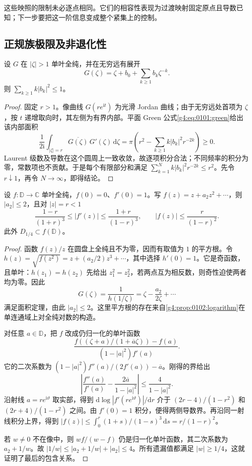 这些映照的限制未必逐点相同。它们的相容性表现为过渡映射固定原点且导数已知；下一步要把这一阶信息变成整个紧集上的控制。

\subsection{正规族极限及非退化性}
\label{g4:subsec:0503:03}

\begin{lemma}[面积定理]
	\label{g4:lem:0503:area}
	设 \(G\) 在 \(|\zeta|>1\) 单叶全纯，并在无穷远有展开
	\[
		G(\zeta)=\zeta+b_0+\sum_{k\ge1}b_k\zeta^{-k}.
	\]
	则 \(\sum_{k\ge1}k|b_k|^2\le1\)。
\end{lemma}
\begin{proof}
	固定 \(r>1\)。像曲线 \(G(re^{\mathrm{i}t})\) 为光滑 Jordan 曲线；由于无穷远处首项为 \(\zeta\)，按 \(t\) 递增取向时，其左侧为有界内部。平面 Green 公式\eqref{g4:eq:0101:green}给出该内部面积
	\[
		\frac1{2\mathrm{i}}\int_{|\zeta|=r}\overline{G(\zeta)}\,G'(\zeta)\,\mathrm{d}\zeta
		=\pi\left(r^2-\sum_{k\ge1}k|b_k|^2r^{-2k}\right)\ge0.
	\]
	Laurent 级数及导数在这个圆周上一致收敛，故逐项积分合法；不同频率的积分为零，常数项也不贡献。于是每个有限部分和满足 \(\sum_{k=1}^Nk|b_k|^2r^{-2k}\le r^2\)。先令 \(r\downarrow1\)，再令 \(N\to\infty\)，即得结论。
\end{proof}

\begin{lemma}
	\label{g4:lem:0503:distortion}
	设 \(f:\mathbb D\to\mathbb C\) 单叶全纯，\(f(0)=0\)、\(f'(0)=1\)。写 \(f(z)=z+a_2z^2+\cdots\)，则 \(|a_2|\le2\)，且对 \(|z|=r<1\)
	\[
		\frac{1-r}{(1+r)^3}\le |f'(z)|\le\frac{1+r}{(1-r)^3},
		\qquad |f(z)|\le\frac r{(1-r)^2}.
	\]
	此外 \(D_{1/4}\subset f(\mathbb D)\)。
\end{lemma}
\begin{proof}
	函数 \(f(z)/z\) 在圆盘上全纯且不为零，因而有取值为 \(1\) 的平方根。令 \(h(z)=\sqrt{f(z^2)}=z+(a_2/2)z^3+\cdots\)，其中选择 \(h'(0)=1\)。它是奇函数，且单叶：\(h(z_1)=h(z_2)\) 先给出 \(z_1^2=z_2^2\)，若两点互为相反数，则奇性迫使两者均为零。因此
	\[
		G(\zeta)=\frac1{h(1/\zeta)}=\zeta-\frac{a_2}{2\zeta}+\cdots
	\]
	满足面积定理，由此 \(|a_2|\le2\)。这里平方根的存在来自\cref{g4:prop:0102:logarithm}在单连通域上对全纯对数的构造。

	对任意 \(a\in\mathbb D\)，把 \(f\) 改成仍归一化的单叶函数
	\[
		\frac{f((\zeta+a)/(1+\overline a\zeta))-f(a)}{(1-|a|^2)f'(a)}.
	\]
	它的二次系数为 \((1-|a|^2)f''(a)/(2f'(a))-\overline a\)。刚得的界给出
	\[
		\left|\frac{f''(a)}{f'(a)}-\frac{2\overline a}{1-|a|^2}\right|
		\le\frac4{1-|a|^2}.
	\]
	沿射线 \(a=re^{\mathrm{i}\vartheta}\) 取实部，得到 \(\mathrm{d}\log|f'(re^{\mathrm{i}\vartheta})|/\mathrm{d}r\) 介于 \((2r-4)/(1-r^2)\) 和 \((2r+4)/(1-r^2)\) 之间。由 \(f'(0)=1\) 积分，便得两侧导数界。再沿同一射线积分上界，得到 \(|f(z)|\le\int_0^r(1+s)/(1-s)^3\,\mathrm{d}s=r/(1-r)^2\)。

	若 \(w\ne0\) 不在像中，则 \(wf/(w-f)\) 仍是归一化单叶函数，其二次系数为 \(a_2+1/w\)。故 \(|1/w|\le|a_2+1/w|+|a_2|\le4\)。所有遗漏值都满足 \(|w|\ge1/4\)，这就证明了最后的包含关系。
\end{proof}

